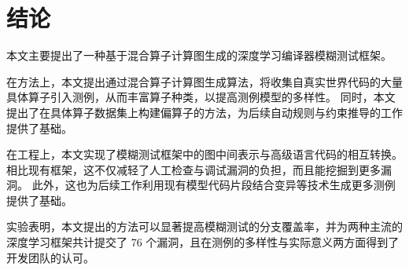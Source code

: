 
\chapter{结论}
\label{chp:sum}

本文主要提出了一种基于混合算子计算图生成的深度学习编译器模糊测试框架。

在方法上，本文提出通过混合算子计算图生成算法，将收集自真实世界代码的大量具体算子引入测例，从而丰富算子种类，以提高测例模型的多样性。
同时，本文提出了在具体算子数据集上构建偏算子的方法，为后续自动规则与约束推导的工作提供了基础。

在工程上，本文实现了模糊测试框架中的图中间表示与高级语言代码的相互转换。
相比现有框架，这不仅减轻了人工检查与调试漏洞的负担，而且能挖掘到更多漏洞。
此外，这也为后续工作利用现有模型代码片段结合变异等技术生成更多测例提供了基础。

实验表明，本文提出的方法可以显著提高模糊测试的分支覆盖率，并为两种主流的深度学习框架共计提交了 76 个漏洞，且在测例的多样性与实际意义两方面得到了开发团队的认可。

